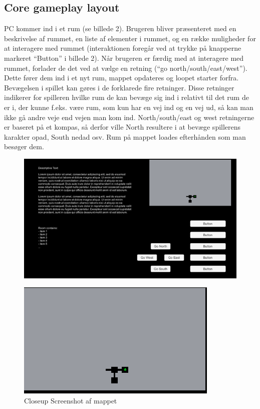 \subsection{Core gameplay layout}
PC kommer ind i et rum (se billede 2).  Brugeren bliver præsenteret med en beskrivelse af rummet, en liste af elementer i rummet, og en række muligheder for at interagere med rummet (interaktionen foregår ved at trykke på knapperne markeret “Button” i billede 2). Når brugeren er færdig med at interagere med rummet, forlader de det ved at vælge en retning (“go north/south/east/west”). 
Dette fører dem ind i et nyt rum, mappet opdateres og loopet starter forfra.
Bevægelsen i spillet kan gøres i de forklarede fire retninger. Disse retninger indikerer for spilleren hvilke rum de kan bevæge sig ind i relativt til det rum de er i, der kunne f.eks. være rum, som kun har en vej ind og en vej ud, så kan man ikke gå andre veje end vejen man kom ind. North/south/east og west retningerne er baseret på et kompas, så derfor ville North resultere i at bevæge spillerens karakter opad, South nedad osv.
Rum på mappet loades efterhånden som man besøger dem.

\begin{figure}[h]
\centering
\includegraphics[width = \textwidth]{02-Body/Images/SpilLayout-udkast.png}
\caption{}
\label{fig:Spillayout-udkast}
\end{figure}

\begin{figure}[h]
\centering
\includegraphics[width = \textwidth]{02-Body/Images/Map-closeup.png}
\caption{Closeup Screenshot af mappet}
\label{fig:Spillayout-udkast}
\end{figure}

